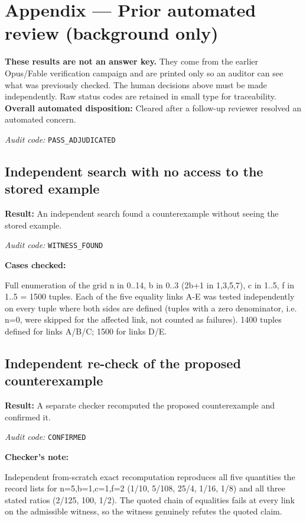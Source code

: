 \documentclass[11pt]{article}
\begin{document}
\section*{Appendix --- Prior automated review (background only)}
\textbf{These results are not an answer key.} They come from the earlier Opus/Fable verification campaign and are printed only so an auditor can see what was previously checked. The human decisions above must be made independently. Raw status codes are retained in small type for traceability.
\textbf{Overall automated disposition:} Cleared after a follow-up reviewer resolved an automated concern.
\par\textit{Audit code:} \nolinkurl{PASS_ADJUDICATED}
\subsection*{Independent search with no access to the stored example}
\textbf{Result:} An independent search found a counterexample without seeing the stored example.
\par\textit{Audit code:} \nolinkurl{WITNESS_FOUND}
\par\textbf{Cases checked:}
\begin{Vsrc}
Full enumeration of the grid n in 0..14, b in 0..3 (2b+1 in {1,3,5,7}), c in 1..5, f in 1..5 = 1500 tuples. Each of the five equality links A-E was tested independently on every tuple where both sides are defined (tuples with a zero denominator, i.e. n=0, were skipped for the affected link, not counted as failures). 1400 tuples defined for links A/B/C; 1500 for links D/E.
\end{Vsrc}
\subsection*{Independent re-check of the proposed counterexample}
\textbf{Result:} A separate checker recomputed the proposed counterexample and confirmed it.
\par\textit{Audit code:} \nolinkurl{CONFIRMED}
\par\textbf{Checker's note:}
\begin{Vsrc}
Independent from-scratch exact recomputation reproduces all five quantities the record lists for n=5,b=1,c=1,f=2 (1/10, 5/108, 25/4, 1/16, 1/8) and all three stated ratios (2/125, 100, 1/2). The quoted chain of equalities fails at every link on the admissible witness, so the witness genuinely refutes the quoted claim.
\end{Vsrc}
\end{document}
